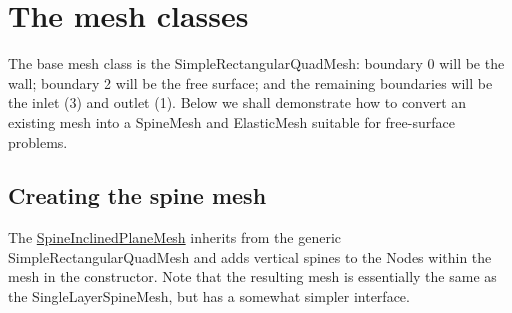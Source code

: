  

 \hypertarget{index_mesh}{}\section{The mesh classes}\label{index_mesh}
The base mesh class is the {\ttfamily Simple\+Rectangular\+Quad\+Mesh\+:} boundary 0 will be the wall; boundary 2 will be the free surface; and the remaining boundaries will be the inlet (3) and outlet (1). Below we shall demonstrate how to convert an existing mesh into a {\ttfamily Spine\+Mesh} and {\ttfamily Elastic\+Mesh} suitable for free-\/surface problems.\hypertarget{index_spine_mesh}{}\subsection{Creating the spine mesh}\label{index_spine_mesh}
The {\ttfamily \hyperlink{classSpineInclinedPlaneMesh}{Spine\+Inclined\+Plane\+Mesh}} inherits from the generic {\ttfamily Simple\+Rectangular\+Quad\+Mesh} and adds vertical spines to the Nodes within the mesh in the constructor. Note that the resulting mesh is essentially the same as the {\ttfamily Single\+Layer\+Spine\+Mesh}, but has a somewhat simpler interface.

